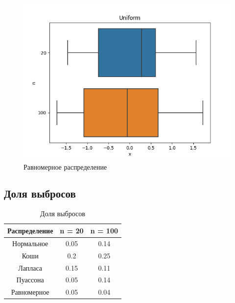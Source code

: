 \documentclass[12pt]{article}
\begin{document}
\begin{figure}
  \centering
  \includegraphics[width=0.4\paperwidth ]{../images/boxplots/Uniform.png}
  \caption{Равномерное распределение}
\end{figure}

\FloatBarrier
\subsection{Доля выбросов}

\begin{table}[h!]
  \centering
  \begin{adjustbox}{width=0.5\textwidth}
    \begin{tabular}{| c | c | c |}

      \hline
      Распределение & n = 20 & n = 100 \\\hline
      Нормальное & 0.05 & 0.14 \\\hline
      Коши & 0.2 & 0.25 \\\hline
      Лапласа & 0.15 & 0.11 \\\hline
      Пуассона & 0.05 & 0.14 \\\hline
      Равномерное & 0.05 & 0.04 \\\hline
      
    \end{tabular}
  \end{adjustbox}
  \caption{Доля выбросов}
\end{table}


\FloatBarrier
\end{document}
